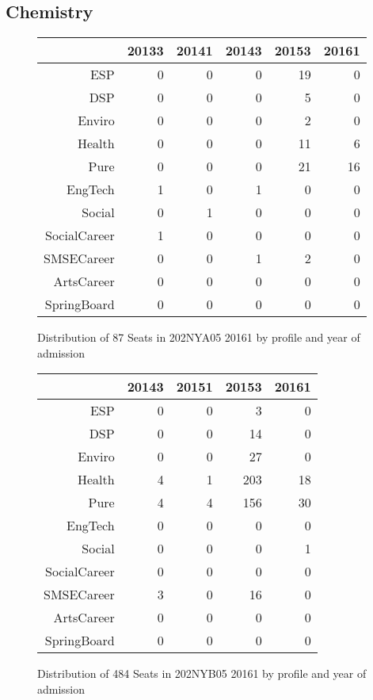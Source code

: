 \documentclass{article}\usepackage[]{graphicx}\usepackage[]{color}
\begin{document}
\subsection{Chemistry}
\begin{figure}[H]
\centering
\begin{tabular}{rrrrrr}
  \hline
 & 20133 & 20141 & 20143 & 20153 & 20161 \\ 
  \hline
ESP &   0 &   0 &   0 &  19 &   0 \\ 
  DSP &   0 &   0 &   0 &   5 &   0 \\ 
  Enviro &   0 &   0 &   0 &   2 &   0 \\ 
  Health &   0 &   0 &   0 &  11 &   6 \\ 
  Pure &   0 &   0 &   0 &  21 &  16 \\ 
  EngTech &   1 &   0 &   1 &   0 &   0 \\ 
  Social &   0 &   1 &   0 &   0 &   0 \\ 
  SocialCareer &   1 &   0 &   0 &   0 &   0 \\ 
  SMSECareer &   0 &   0 &   1 &   2 &   0 \\ 
  ArtsCareer &   0 &   0 &   0 &   0 &   0 \\ 
  SpringBoard &   0 &   0 &   0 &   0 &   0 \\ 
   \hline
\end{tabular}
\caption{Distribution of 87 Seats in 202NYA05 20161 by profile and year of admission} 
\end{figure}
\begin{figure}[H]
\centering
\begin{tabular}{rrrrr}
  \hline
 & 20143 & 20151 & 20153 & 20161 \\ 
  \hline
ESP &   0 &   0 &   3 &   0 \\ 
  DSP &   0 &   0 &  14 &   0 \\ 
  Enviro &   0 &   0 &  27 &   0 \\ 
  Health &   4 &   1 & 203 &  18 \\ 
  Pure &   4 &   4 & 156 &  30 \\ 
  EngTech &   0 &   0 &   0 &   0 \\ 
  Social &   0 &   0 &   0 &   1 \\ 
  SocialCareer &   0 &   0 &   0 &   0 \\ 
  SMSECareer &   3 &   0 &  16 &   0 \\ 
  ArtsCareer &   0 &   0 &   0 &   0 \\ 
  SpringBoard &   0 &   0 &   0 &   0 \\ 
   \hline
\end{tabular}
\caption{Distribution of 484 Seats in 202NYB05 20161 by profile and year of admission} 
\end{figure}
\end{document}
